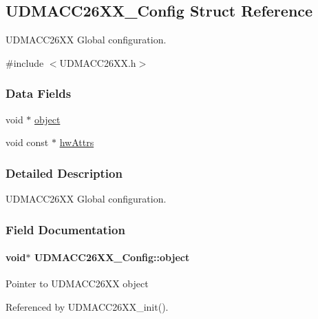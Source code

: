 \subsection{U\-D\-M\-A\-C\-C26\-X\-X\-\_\-\-Config Struct Reference}
\label{struct_u_d_m_a_c_c26_x_x___config}


U\-D\-M\-A\-C\-C26\-X\-X Global configuration.  




{\ttfamily \#include $<$U\-D\-M\-A\-C\-C26\-X\-X.\-h$>$}

\subsubsection*{Data Fields}
\begin{DoxyCompactItemize}
\item 
void $\ast$ \hyperlink{struct_u_d_m_a_c_c26_x_x___config_a9b87747e67e7cba15e71ccdd495bbf65}{object}
\item 
void const $\ast$ \hyperlink{struct_u_d_m_a_c_c26_x_x___config_a394867c60268267c4c503fb10100d960}{hw\-Attrs}
\end{DoxyCompactItemize}


\subsubsection{Detailed Description}
U\-D\-M\-A\-C\-C26\-X\-X Global configuration. 

\subsubsection{Field Documentation}
\paragraph[{object}]{\setlength{\rightskip}{0pt plus 5cm}void$\ast$ U\-D\-M\-A\-C\-C26\-X\-X\-\_\-\-Config\-::object}\label{struct_u_d_m_a_c_c26_x_x___config_a9b87747e67e7cba15e71ccdd495bbf65}
Pointer to U\-D\-M\-A\-C\-C26\-X\-X object 

Referenced by U\-D\-M\-A\-C\-C26\-X\-X\-\_\-init().

